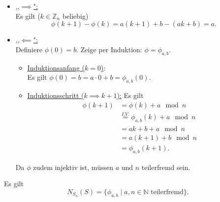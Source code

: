 \documentclass[a4paper]{article}
\newcommand{\N}{\mathbb{N}}
\newcommand{\Z}{\mathbb{Z}}
\begin{document}
    \begin{beweis}
        \begin{itemize}
            \item \underline{,,$\implies$":} \\
                Es gilt ($k \in \Z_n$ beliebig)
                \[
                    \phi(k+1) - \phi(k) = a(k+1) + b - (ak + b) = a
                .\] 
            \item \underline{,,$\impliedby$":} \\
            Definiere $\phi(0) = b.$ Zeige per Induktion: $\phi = \phi_{a, b}$.
        \begin{itemize}
            \item \underline{Induktionsanfang ($k = 0$)}: \\
                Es gilt $\phi(0) = b = a \cdot 0 + b = \phi_{a, b}(0)$.
            \item \underline{Induktionsschritt ($k \implies k+1$):}
                Es gilt
                \begin{align*}
                    \phi(k+1) &= \phi(k) +  a \mod n \\
                              &\overset{I.V.}{=} \phi_{a,b}(k) + a \mod n \\
                              &= ak + b + a \mod n \\
                              &= a(k+1) + b \mod n \\
                              &= \phi_{a, b}(k+1)
                .\end{align*}
        \end{itemize}
        Da $\phi$ zudem injektiv ist, müssen $a$ und $n$ teilerfremd sein.
        \end{itemize}
    \end{beweis}
    \begin{satz}
        Es gilt
        \[
            N_{S_n}(S) = \{\phi_{a, b}  \mid a, n \in \N \text{ teilerfremd}\} 
        .\] 
    \end{satz}
\end{document}
